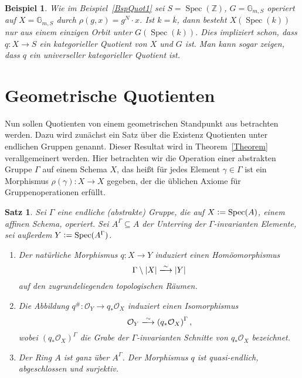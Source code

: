 \documentclass[DIV11,11pt]{scrartcl}
\theoremstyle{Definitionen}
\newtheorem{Bsp}[Def]{Beispiel}
\theoremstyle{Aussagen}
\newtheorem{Satz}[Def]{Satz}
\newcommand{\coloneq}{\ensuremath{\mathrel{\mathop{\raisebox{0.5pt}{:}}}=}}
\DeclareMathOperator{\Spec}{Spec}
\begin{document}
\begin{Bsp}
Wie im Beispiel~\ref{BspQuot1} sei $S=\Spec(\mathbb{Z})$, $G=\mathbb{G}_{m,S}$ operiert auf $X=\mathbb{G}_{m,S}$ durch $\rho(g,x)=g^N\cdot x$. Ist $k=\overline{k}$, dann besteht $X(\Spec(k))$ nur aus einem einzigen Orbit unter $G(\Spec(k))$. Dies impliziert schon, dass $q\colon X\rightarrow S$ ein kategorieller Quotient von $X$ und $G$ ist. Man kann sogar zeigen, dass $q$ ein universeller kategorieller Quotient ist.
\end{Bsp}


\section{Geometrische Quotienten}
Nun sollen Quotienten von einem geometrischen Standpunkt aus betrachten werden. Dazu wird zunächst ein Satz über die Existenz Quotienten unter endlichen Gruppen genannt. Dieser Resultat wird in Theorem~\ref{Theorem} verallgemeinert werden. Hier betrachten wir die Operation einer abstrakten Gruppe $\Gamma$ auf einem Schema $X$, das heißt für jedes Element $\gamma\in\Gamma$ ist ein Morphismus $\rho(\gamma)\colon X\rightarrow X$ gegeben, der die üblichen Axiome für Gruppenoperationen erfüllt.

\begin{Satz}\label{ersterQuotSatz}
Sei $\Gamma$ eine endliche (abstrakte) Gruppe, die auf $X\coloneq\Spec(A)$, einem affinen Schema, operiert. Sei $A^{\Gamma}\subseteq A$ der Unterring der $\Gamma$-invarianten Elemente, sei außerdem $Y\coloneq\Spec(A^{\Gamma})$.
\begin{enumerate}
\item Der natürliche Morphismus $q\colon X\rightarrow Y$ induziert einen Homöomorphismus
\begin{displaymath}
\Gamma\setminus\left|X\right|\xlongrightarrow{\sim}\left|Y\right|
\end{displaymath}
auf den zugrundeliegenden topologischen Räumen.
\item Die Abbildung $q^{\#}\colon\mathcal{O}_Y\rightarrow q_*\mathcal{O}_X$ induziert einen Isomorphismus
\begin{displaymath}
\mathcal{O}_Y\xlongrightarrow{\sim}\left(q_*\mathcal{O}_X\right)^{\Gamma},
\end{displaymath}
wobei $\left(q_*\mathcal{O}_X\right)^{\Gamma}$ die Grabe der $\Gamma$-invarianten Schnitte von $q_*\mathcal{O}_X$ bezeichnet.
\item Der Ring $A$ ist ganz über $A^{\Gamma}$. Der Morphismus $q$ ist quasi-endlich, abgeschlossen und surjektiv.
\end{enumerate}
\end{Satz}
\end{document}
